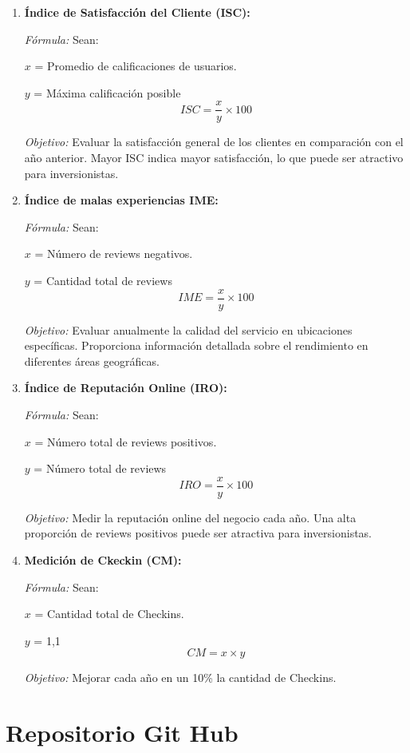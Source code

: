 \documentclass[12pt]{article}
\begin{document}
\begin{enumerate}
    \item \textbf{Índice de Satisfacción del Cliente (ISC):}
    
    \textit{Fórmula:} Sean:
    
    $x$ = Promedio de calificaciones de usuarios.
    
    $y$ = Máxima calificación posible 
    $$ISC = \frac{x}{y}\times 100$$
    
    \textit{Objetivo:} Evaluar la satisfacción general de los clientes en comparación con el año anterior. Mayor ISC indica mayor satisfacción, lo que puede ser atractivo para inversionistas.

     \item \textbf{Índice de malas experiencias IME:}
     
    \textit{Fórmula:} Sean: 
    
    $x$ = Número de reviews negativos.
    
    $y$ = Cantidad total de reviews 
    $$IME = \frac{x}{y}\times 100$$
    
    \textit{Objetivo:} Evaluar anualmente la calidad del servicio en ubicaciones específicas. Proporciona información detallada sobre el rendimiento en diferentes áreas geográficas.

    \item \textbf{Índice de Reputación Online (IRO):}
    
    \textit{Fórmula:} Sean:

    $x$ = Número total de reviews positivos.
    
    $y$ = Número total de reviews 
    $$ IRO = \frac{x}{y}\times 100$$
        
    \textit{Objetivo:} Medir la reputación online del negocio cada año. Una alta proporción de reviews positivos puede ser atractiva para inversionistas.

    \item \textbf{Medición de Ckeckin (CM):}
    
    \textit{Fórmula:} Sean:

    $x$ = Cantidad total de Checkins.
    
    $y$ = 1,1  
    $$ CM = x\times y$$
    
    \textit{Objetivo:} Mejorar cada año en un 10\% la cantidad de Checkins.
    
\end{enumerate}

\section{Repositorio Git Hub}
\end{document}
